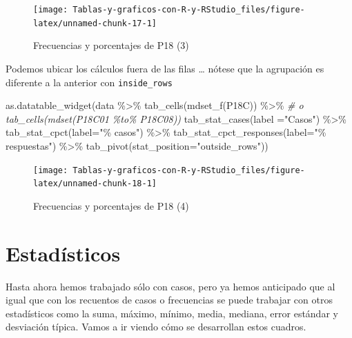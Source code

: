 \documentclass[
]{book}
\newenvironment{Shaded}{\begin{snugshade}}{\end{snugshade}}
\newcommand{\AttributeTok}[1]{\textcolor[rgb]{0.77,0.63,0.00}{#1}}
\newcommand{\CommentTok}[1]{\textcolor[rgb]{0.56,0.35,0.01}{\textit{#1}}}
\newcommand{\FunctionTok}[1]{\textcolor[rgb]{0.00,0.00,0.00}{#1}}
\newcommand{\NormalTok}[1]{#1}
\newcommand{\SpecialCharTok}[1]{\textcolor[rgb]{0.00,0.00,0.00}{#1}}
\newcommand{\StringTok}[1]{\textcolor[rgb]{0.31,0.60,0.02}{#1}}
\begin{document}
\begin{figure}[H]

{\centering \texttt{[image: Tablas-y-graficos-con-R-y-RStudio\_files/figure-latex/unnamed-chunk-17-1]} 

}

\caption{Frecuencias y porcentajes de P18 (3)}\label{fig:unnamed-chunk-17}
\end{figure}

Podemos ubicar los cálculos fuera de las filas \ldots{} nótese que la agrupación es diferente a la anterior con \texttt{inside\_rows}

\begin{Shaded}
\begin{Highlighting}[]
\FunctionTok{as.datatable\_widget}\NormalTok{(data }\SpecialCharTok{\%\textgreater{}\%} 
  \FunctionTok{tab\_cells}\NormalTok{(}\FunctionTok{mdset\_f}\NormalTok{(P18C)) }\SpecialCharTok{\%\textgreater{}\%}  \CommentTok{\# o tab\_cells(mdset(P18C01 \%to\% P18C08))}
  \FunctionTok{tab\_stat\_cases}\NormalTok{(}\AttributeTok{label =}\StringTok{"Casos"}\NormalTok{) }\SpecialCharTok{\%\textgreater{}\%} 
  \FunctionTok{tab\_stat\_cpct}\NormalTok{(}\AttributeTok{label=}\StringTok{"\% casos"}\NormalTok{) }\SpecialCharTok{\%\textgreater{}\%} 
  \FunctionTok{tab\_stat\_cpct\_responses}\NormalTok{(}\AttributeTok{label=}\StringTok{"\% respuestas"}\NormalTok{) }\SpecialCharTok{\%\textgreater{}\%} 
  \FunctionTok{tab\_pivot}\NormalTok{(}\AttributeTok{stat\_position=}\StringTok{"outside\_rows"}\NormalTok{))}
\end{Highlighting}
\end{Shaded}

\begin{figure}[H]

{\centering \texttt{[image: Tablas-y-graficos-con-R-y-RStudio\_files/figure-latex/unnamed-chunk-18-1]} 

}

\caption{Frecuencias y porcentajes de P18 (4)}\label{fig:unnamed-chunk-18}
\end{figure}

\hypertarget{estaduxedsticos}{%
\section{Estadísticos}\label{estaduxedsticos}}

Hasta ahora hemos trabajado sólo con casos, pero ya hemos anticipado que al igual que con los recuentos de casos o frecuencias se puede trabajar con otros estadísticos como la suma, máximo, mínimo, media, mediana, error estándar y desviación típica. Vamos a ir viendo cómo se desarrollan estos cuadros.
\end{document}
